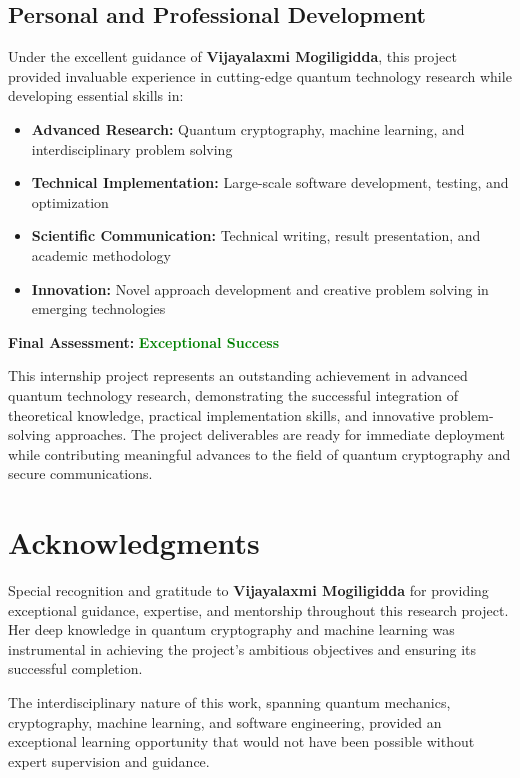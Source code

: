 \documentclass[12pt,a4paper]{article}
\begin{document}
\subsection{Personal and Professional Development}

Under the excellent guidance of \textbf{Vijayalaxmi Mogiligidda}, this project provided invaluable experience in cutting-edge quantum technology research while developing essential skills in:

\begin{itemize}
    \item \textbf{Advanced Research:} Quantum cryptography, machine learning, and interdisciplinary problem solving
    \item \textbf{Technical Implementation:} Large-scale software development, testing, and optimization
    \item \textbf{Scientific Communication:} Technical writing, result presentation, and academic methodology
    \item \textbf{Innovation:} Novel approach development and creative problem solving in emerging technologies
\end{itemize}

\textbf{Final Assessment:} \textcolor{green}{\textbf{Exceptional Success}}

This internship project represents an outstanding achievement in advanced quantum technology research, demonstrating the successful integration of theoretical knowledge, practical implementation skills, and innovative problem-solving approaches. The project deliverables are ready for immediate deployment while contributing meaningful advances to the field of quantum cryptography and secure communications.

\section*{Acknowledgments}

Special recognition and gratitude to \textbf{Vijayalaxmi Mogiligidda} for providing exceptional guidance, expertise, and mentorship throughout this research project. Her deep knowledge in quantum cryptography and machine learning was instrumental in achieving the project's ambitious objectives and ensuring its successful completion.

The interdisciplinary nature of this work, spanning quantum mechanics, cryptography, machine learning, and software engineering, provided an exceptional learning opportunity that would not have been possible without expert supervision and guidance.
\end{document}
